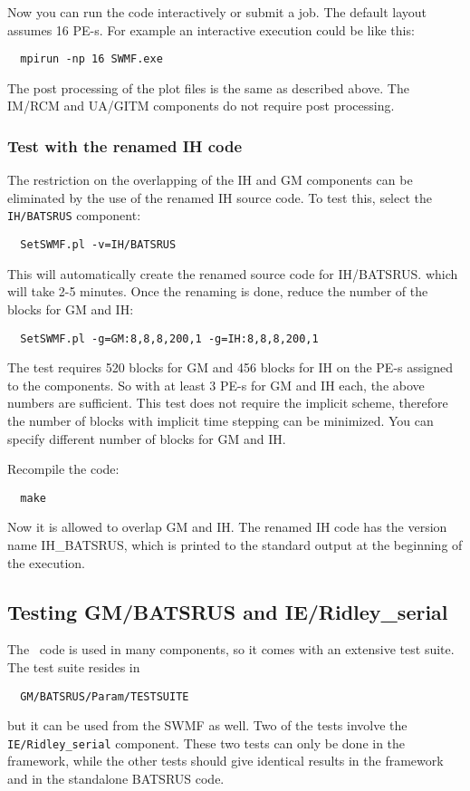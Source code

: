 Now you can run the code interactively or submit a job.  The default
layout assumes 16 PE-s. For example an interactive execution could be
like this:
\begin{verbatim}
  mpirun -np 16 SWMF.exe
\end{verbatim}
The post processing of the plot files is the same as described above. 
The IM/RCM and UA/GITM components do not require post processing.

\subsubsection{Test with the renamed IH code}

The restriction on the overlapping of the IH and GM components
can be eliminated by the use of the renamed IH source code. 
To test this, select the {\tt IH/BATSRUS} component:
\begin{verbatim}
  SetSWMF.pl -v=IH/BATSRUS
\end{verbatim}
This will automatically create the renamed source code for IH/BATSRUS.
which will take 2-5 minutes. Once the renaming
is done, reduce the number of the blocks for GM and IH:
\begin{verbatim}
  SetSWMF.pl -g=GM:8,8,8,200,1 -g=IH:8,8,8,200,1
\end{verbatim}
The test requires 520 blocks for GM and 456 blocks for IH on the PE-s
assigned to the components. So with at least 3 PE-s for GM and IH each,
the above numbers are sufficient. This test does not require the implicit
scheme, therefore the number of blocks with implicit time stepping can
be minimized. You can specify different number of blocks for GM and IH. 

Recompile the code:
\begin{verbatim}
  make
\end{verbatim}
Now it is allowed to overlap GM and IH. The renamed IH code has the 
version name IH\_BATSRUS, which is printed to the standard output at the
beginning of the execution.

\subsection{Testing GM/BATSRUS and IE/Ridley\_serial}

The \BATSRUS\ code is used in many components, so it comes
with an extensive test suite. The test suite resides in
\begin{verbatim}
  GM/BATSRUS/Param/TESTSUITE
\end{verbatim}
but it can be used from the SWMF as well. Two of the tests
involve the {\tt IE/Ridley\_serial} component. These two tests
can only be done in the framework, while the other tests should give
identical results in the framework and in the standalone
BATSRUS code.

